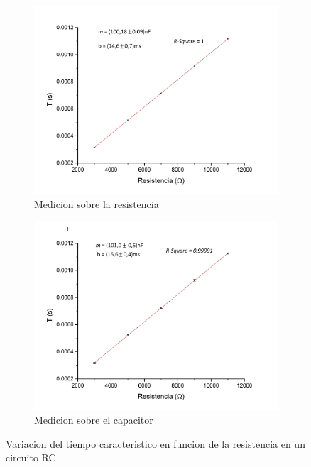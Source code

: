 \documentclass[11pt,a4paper]{article}
\begin{document}
\begin{figure}[H]

\begin{subfigure}{0.5\textwidth}
\includegraphics[scale=0.35]{Tau-RCvsR_Resistencia}
  \caption{Medicion sobre la resistencia}
  \label{subfig:RCvsRR}
\end{subfigure}
\begin{subfigure}{0.5\textwidth}
\includegraphics[scale=0.35]{Tau-RCvsR_Capacitor}
  \caption{Medicion sobre el capacitor}
  \label{subfig:RCvsRC}
\end{subfigure}
  \caption{Variacion del tiempo caracteristico en funcion de la resistencia en un circuito RC}
  \label{fig:RCvsR}
\end{figure}
\end{document}
